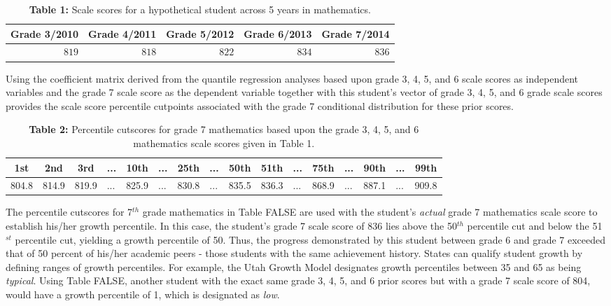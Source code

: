 \documentclass[12pt]{article}
\begin{document}
\begin{table}[H]
\caption*{\textbf{Table 1:} Scale scores for a hypothetical student across 5 years in mathematics.\label{table1}} 
\begin{center}
\begin{tabular}{rrrrr}
\hline\hline
\multicolumn{1}{c}{Grade 3/2010}&\multicolumn{1}{c}{Grade 4/2011}&\multicolumn{1}{c}{Grade 5/2012}&\multicolumn{1}{c}{Grade 6/2013}&\multicolumn{1}{c}{Grade 7/2014}\tabularnewline
\hline
$819$&$818$&$822$&$834$&$836$\tabularnewline
\hline
\end{tabular}\end{center}

\end{table}

Using the coefficient matrix derived from the quantile regression
analyses based upon grade 3, 4, 5, and 6 scale scores as independent
variables and the grade 7 scale score as the dependent variable together
with this student's vector of grade 3, 4, 5, and 6 grade scale scores
provides the scale score percentile cutpoints associated with the grade
7 conditional distribution for these prior scores.

\begin{table}[H]
\caption*{\textbf{Table 2:} Percentile cutscores for grade 7 mathematics based upon the grade 3, 4, 5, and 6 mathematics scale scores given in Table 1.\label{table2}} 
\begin{center}
\begin{tabular}{llllllllllllllll}
\hline\hline
\multicolumn{1}{c}{1st}&\multicolumn{1}{c}{2nd}&\multicolumn{1}{c}{3rd}&\multicolumn{1}{c}{...}&\multicolumn{1}{c}{10th}&\multicolumn{1}{c}{...}&\multicolumn{1}{c}{25th}&\multicolumn{1}{c}{...}&\multicolumn{1}{c}{50th}&\multicolumn{1}{c}{51th}&\multicolumn{1}{c}{...}&\multicolumn{1}{c}{75th}&\multicolumn{1}{c}{...}&\multicolumn{1}{c}{90th}&\multicolumn{1}{c}{...}&\multicolumn{1}{c}{99th}\tabularnewline
\hline
804.8&814.9&819.9&...&825.9&...&830.8&...&835.5&836.3&...&868.9&...&887.1&...&909.8\tabularnewline
\hline
\end{tabular}\end{center}

\end{table}

The percentile cutscores for 7\(^{th}\) grade mathematics in Table FALSE
are used with the student's \emph{actual} grade 7 mathematics scale
score to establish his/her growth percentile. In this case, the
student's grade 7 scale score of 836 lies above the 50\(^{th}\)
percentile cut and below the 51\(^{st}\) percentile cut, yielding a
growth percentile of 50. Thus, the progress demonstrated by this student
between grade 6 and grade 7 exceeded that of 50 percent of his/her
academic peers - those students with the same achievement history.
States can qualify student growth by defining ranges of growth
percentiles. For example, the Utah Growth Model designates growth
percentiles between 35 and 65 as being \emph{typical}. Using Table
FALSE, another student with the exact same grade 3, 4, 5, and 6 prior
scores but with a grade 7 scale score of 804, would have a growth
percentile of 1, which is designated as \emph{low}.
\end{document}
